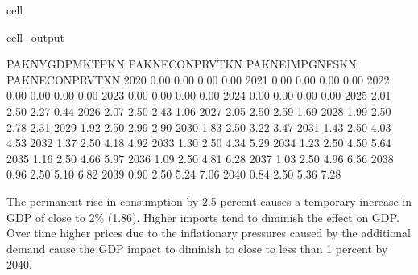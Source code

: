 \documentclass[letterpaper,10pt,english]{jupyterBook}
\begin{document}
\begin{sphinxuseclass}{cell}
\begin{sphinxVerbatimOutput}
\begin{sphinxuseclass}{cell_output}
\begin{sphinxVerbatim}[commandchars=\\\{\}]
      PAKNYGDPMKTPKN  PAKNECONPRVTKN  PAKNEIMPGNFSKN  PAKNECONPRVTXN
2020           0.00\PYGZpc{}           0.00\PYGZpc{}           0.00\PYGZpc{}           0.00\PYGZpc{}
2021           0.00\PYGZpc{}           0.00\PYGZpc{}           0.00\PYGZpc{}           0.00\PYGZpc{}
2022           0.00\PYGZpc{}           0.00\PYGZpc{}           0.00\PYGZpc{}           0.00\PYGZpc{}
2023           0.00\PYGZpc{}           0.00\PYGZpc{}           0.00\PYGZpc{}           0.00\PYGZpc{}
2024           0.00\PYGZpc{}           0.00\PYGZpc{}           0.00\PYGZpc{}           0.00\PYGZpc{}
2025           2.01\PYGZpc{}           2.50\PYGZpc{}           2.27\PYGZpc{}           0.44\PYGZpc{}
2026           2.07\PYGZpc{}           2.50\PYGZpc{}           2.43\PYGZpc{}           1.06\PYGZpc{}
2027           2.05\PYGZpc{}           2.50\PYGZpc{}           2.59\PYGZpc{}           1.69\PYGZpc{}
2028           1.99\PYGZpc{}           2.50\PYGZpc{}           2.78\PYGZpc{}           2.31\PYGZpc{}
2029           1.92\PYGZpc{}           2.50\PYGZpc{}           2.99\PYGZpc{}           2.90\PYGZpc{}
2030           1.83\PYGZpc{}           2.50\PYGZpc{}           3.22\PYGZpc{}           3.47\PYGZpc{}
2031           1.43\PYGZpc{}           2.50\PYGZpc{}           4.03\PYGZpc{}           4.53\PYGZpc{}
2032           1.37\PYGZpc{}           2.50\PYGZpc{}           4.18\PYGZpc{}           4.92\PYGZpc{}
2033           1.30\PYGZpc{}           2.50\PYGZpc{}           4.34\PYGZpc{}           5.29\PYGZpc{}
2034           1.23\PYGZpc{}           2.50\PYGZpc{}           4.50\PYGZpc{}           5.64\PYGZpc{}
2035           1.16\PYGZpc{}           2.50\PYGZpc{}           4.66\PYGZpc{}           5.97\PYGZpc{}
2036           1.09\PYGZpc{}           2.50\PYGZpc{}           4.81\PYGZpc{}           6.28\PYGZpc{}
2037           1.03\PYGZpc{}           2.50\PYGZpc{}           4.96\PYGZpc{}           6.56\PYGZpc{}
2038           0.96\PYGZpc{}           2.50\PYGZpc{}           5.10\PYGZpc{}           6.82\PYGZpc{}
2039           0.90\PYGZpc{}           2.50\PYGZpc{}           5.24\PYGZpc{}           7.06\PYGZpc{}
2040           0.84\PYGZpc{}           2.50\PYGZpc{}           5.36\PYGZpc{}           7.28\PYGZpc{}
\end{sphinxVerbatim}

\end{sphinxuseclass}\end{sphinxVerbatimOutput}

\end{sphinxuseclass}
\sphinxAtStartPar
The permanent rise in consumption by 2.5 percent causes a temporary increase in GDP of close to 2\% (1.86). Higher imports tend to diminish the effect on GDP. Over time higher prices due to the inflationary pressures caused by the additional demand cause the GDP impact to diminish to close to less than 1 percent by 2040.
\end{document}
